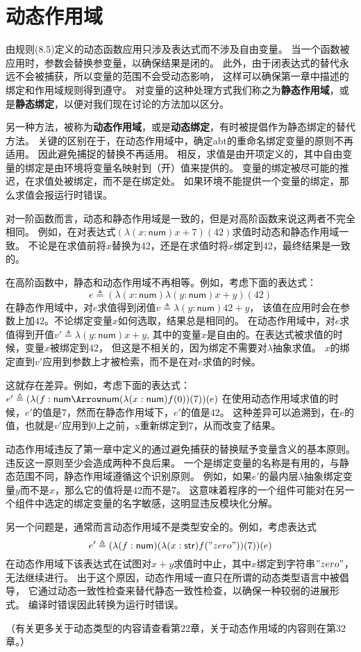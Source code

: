 \section{动态作用域}

由规则(8.5)定义的动态函数应用只涉及表达式而不涉及自由变量。
当一个函数被应用时，参数会替换参变量，以确保结果是闭的。
此外，由于闭表达式的替代永远不会被捕获，所以变量的范围不会受动态影响，
这样可以确保第一章中描述的绑定和作用域规则得到遵守。
对变量的这种处理方式我们称之为\textbf{静态作用域}，或是\textbf{静态绑定}，以便对我们现在讨论的方法加以区分。

另一种方法，被称为\textbf{动态作用域}，或是\textbf{动态绑定}，有时被提倡作为静态绑定的替代方法。
关键的区别在于，在动态作用域中，确定abt的重命名绑定变量的原则不再适用。
因此避免捕捉的替换不再适用。
相反，求值是由开项定义的，其中自由变量的绑定是由环境将变量名映射到（开）值来提供的。
变量的绑定被尽可能的推迟，在求值处被绑定，而不是在绑定处。
如果环境不能提供一个变量的绑定，那么求值会报运行时错误。

对一阶函数而言，动态和静态作用域是一致的，但是对高阶函数来说这两者不完全相同。
例如，在对表达式$(\lambda(x:\mathsf{num})x+7)(42)$求值时动态和静态作用域一致。
不论是在求值前将$x$替换为42，还是在求值时将$x$绑定到42，最终结果是一致的。

在高阶函数中，静态和动态作用域不再相等。例如，考虑下面的表达式：
$$e \triangleq (\lambda(x:\mathsf{num})\lambda(y:\mathsf{num})x+y)(42)$$
在静态作用域中，对$e$求值得到闭值$v \triangleq \lambda(y:\mathsf{num})42+y$，
该值在应用时会在参数上加$42$。不论绑定变量$x$如何选取，结果总是相同的。
在动态作用域中，对$e$求值得到开值$v' \triangleq \lambda(y:\mathsf{num})x+y$,
其中的变量$x$是自由的。在表达式被求值的时候，变量$x$被绑定到$42$，
但这是不相关的，因为绑定不需要对$\lambda$抽象求值。
$x$的绑定直到$v'$应用到参数上才被检索，而不是在对$e$求值的时候。

这就存在差异。例如，考虑下面的表达式：
$e' \triangleq (\lambda ( f : \mathsf{num} \Arrow \mathsf{num} (\lambda(x:\mathsf{num})f(0))(7))(e)$
在使用动态作用域求值的时候，$e'$的值是$7$，然而在静态作用域下，$e'$的值是$42$。
这种差异可以追溯到，在$e$的值，也就是$v'$应用到$0$上之前，x重新绑定到7，从而改变了结果。

动态作用域违反了第一章中定义的通过避免捕获的替换赋予变量含义的基本原则。
违反这一原则至少会造成两种不良后果。
一个是绑定变量的名称是有用的，与静态范围不同，静态作用域遵循这个识别原则。
例如，如果$e'$的最内层$\lambda$抽象绑定变量$y$而不是$x$，那么它的值将是$42$而不是$7$。
这意味着程序的一个组件可能对在另一个组件中选定的绑定变量的名字敏感，这明显违反模块化分解。

另一个问题是，通常而言动态作用域不是类型安全的。例如，考虑表达式
$$e' \triangleq (\lambda(f:\mathsf{num})(\lambda(x:\mathsf{str})f("zero"))(7))(e)$$
在动态作用域下该表达式在试图对$x+y$求值时中止，其中$x$绑定到字符串$"zero"$，无法继续进行。
出于这个原因，动态作用域一直只在所谓的动态类型语言中被倡导，
它通过动态一致性检查来替代静态一致性检查，以确保一种较弱的进展形式。
编译时错误因此转换为运行时错误。

（有关更多关于动态类型的内容请查看第22章，关于动态作用域的内容则在第32章。）
